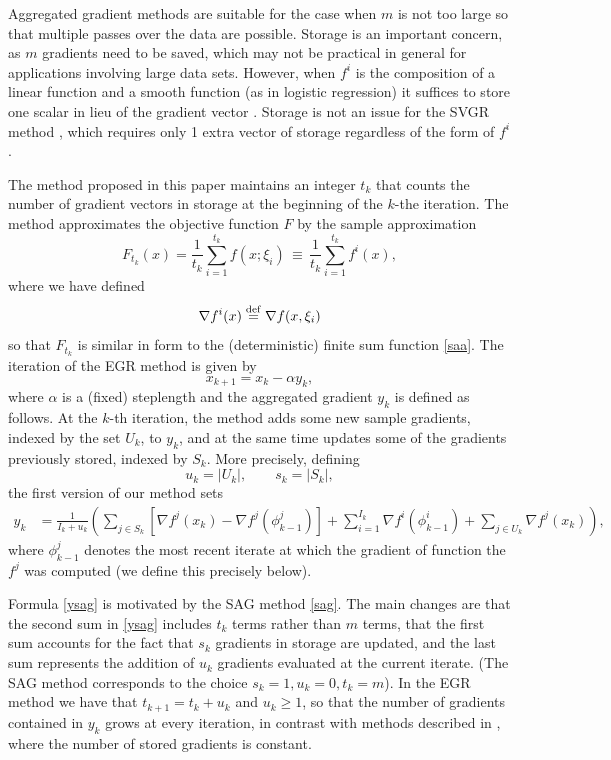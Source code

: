 \documentclass[11pt]{article}
\newcommand{\defeq}{\stackrel{\rm def}{=}}
\begin{document}
Aggregated gradient methods are suitable for the case when $m$ is not too large so that multiple passes over the data are possible. Storage is an important concern, as $m$ gradients need to be saved, which may not be practical in general for applications involving large data sets. However,  when $f^i$ is the composition of a linear function and a smooth function (as in logistic regression) it suffices to store one scalar in lieu of the gradient vector \cite{roux2012stochastic}. Storage is not an issue for the SVGR method \cite{johnson2013accelerating}, which requires only 1 extra vector of storage regardless of the form of $f^i$.

The  method proposed in this paper maintains an integer $t_k $ that counts the number of gradient vectors in storage at the beginning of the $k$-the iteration. The method approximates the objective function $F$ by the sample approximation
\[  \label{soho}
	F_{t_k}(x)= \frac{1}{t_k} \sum_{i =1}^{ t_k} f(x; \xi_i) \, \equiv \,  \frac{1}{t_k} \sum_{i =1}^{ t_k} f^i (x) ,
\]
where  we have defined
\begin{equation} \label{spring}
	\nabla f^i(x) \defeq \nabla f(x, \xi_i) 
\end{equation}
so that $F_{t_k}$ is similar in form to the (deterministic) finite sum function \eqref{saa}.
The iteration of the EGR method is given by
\begin{equation}  \label{egri}
        x_{k+1}= x_k - \alpha y_k ,
\end{equation}
where $\alpha$ is a (fixed) steplength and the aggregated gradient $y_k$ is defined as follows. At the $k$-th iteration, the method adds some new sample gradients, indexed by the set $U_k$, to $y_k$, and at the same time updates some of the gradients previously stored, indexed by $S_k$. More precisely, defining
\begin{equation}   \label{usdef}
      u_k = | U_k |, \qquad s_k = | S_k |,
\end{equation}
the first version of our method sets
\begin{align}  \label{ysag}
      y_k & =  \frac{1}{I_{k}+u_k}  \left( \sum_{j \in S_k} \left[  \nabla f^j(x_{k}) -   \nabla f^j(\phi_{k-1}^j)\right]+ \sum_{i = 1}^{I_{k} }  \nabla f^i (\phi^i_{k-1})  + \sum_{j \in U_k} \nabla f^j(x_k) \right) ,
\end{align}
where  $\phi_{k-1}^j$ denotes the most recent iterate at which the gradient of function the $f^j$ was computed (we define this precisely below). 

Formula \eqref{ysag} is motivated by the SAG method \eqref{sag}.   The main changes are that the  second sum in \eqref{ysag}  includes $t_k$ terms rather than $m$ terms, that the first sum accounts for the fact that $s_k$ gradients in storage are updated, and the last sum represents the addition of $ u_k$ gradients evaluated at the current iterate. (The SAG method corresponds to the choice $s_k=1, u_k =0, t_k=m$). In the EGR method we have that $t_{k+1}= t_{k} + u_k$ and $u_k \geq 1$,  so that the number of gradients contained in $y_k$ grows at every iteration, in contrast with methods described in 
\cite{johnson2013accelerating,NIPS2014_5258,shalev2013stochastic,mairal2015incremental,defazio2014finito},
 where the number of stored gradients is constant.
 
\end{document}
